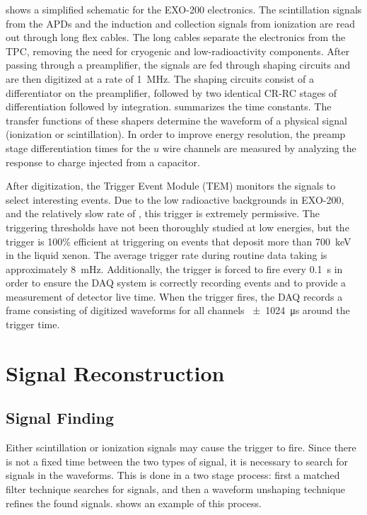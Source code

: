 \documentclass[herrin-thesis.tex]{subfiles}
\begin{document}
 shows a simplified schematic for the EXO-200 electronics. The scintillation signals from the APDs and the induction and collection signals from ionization are read out through long flex cables. The long cables separate the electronics from the TPC, removing the need for cryogenic and low-radioactivity components. After passing through a preamplifier, the signals are fed through shaping circuits and are then digitized at a rate of \SI{1}{\MHz}. The shaping circuits consist of a differentiator on the preamplifier, followed by two identical CR-RC stages of differentiation followed by integration.  summarizes the time constants.  The transfer functions of these shapers determine the waveform of a physical signal (ionization or scintillation). In order to improve energy resolution, the preamp stage differentiation times for the \(u\) wire channels are measured by analyzing the response to charge injected from a capacitor.

After digitization, the Trigger Event Module (TEM) monitors the signals to select interesting events. Due to the low radioactive backgrounds in EXO-200, and the relatively slow rate of \twonu, this trigger is extremely permissive. The triggering thresholds have not been thoroughly studied at low energies, but the trigger is 100\% efficient at triggering on events that deposit more than \SI{700}{\keV} in the liquid xenon. The average trigger rate during routine data taking is approximately \SI{8}{\mHz}. Additionally, the trigger is forced to fire every \SI{0.1}{\s} in order to ensure the DAQ system is correctly recording events and to provide a measurement of detector live time. When the trigger fires, the DAQ records a frame consisting of digitized waveforms for all channels \SI{\pm1024}{\micro\s} around the trigger time.

\section{Signal Reconstruction}
\label{sec:data_reconstruction}
\subsection{Signal Finding}
Either scintillation or ionization signals may cause the trigger to fire. Since there is not a fixed time between the two types of signal, it is necessary to search for signals in the waveforms. This is done in a two stage process: first a matched filter technique searches for signals, and then a waveform unshaping technique refines the found signals.  shows an example of this process.
\end{document}
